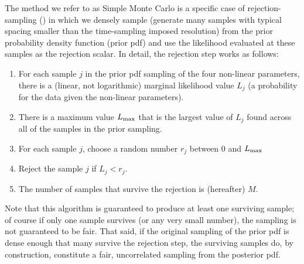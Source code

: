 \documentclass[manuscript, letterpaper]{aastex6}
\newcommand{\resp}[1]{{\color{mahogany}#1}}
\begin{document}
The method we refer to as Simple Monte Carlo is a specific case of
rejection-sampling (\citealt{VonNeumann:1951}) in which we densely sample
(\resp{generate many samples with typical spacing smaller than the time-sampling
imposed resolution}) from the prior probability density function (prior pdf) and
use the likelihood evaluated at these samples as the rejection scalar.
In detail, the rejection step works as follows:
\begin{enumerate}\itemsep0ex
\item For each sample $j$ in the prior pdf sampling of the four non-linear
  parameters, there is a (linear, not logarithmic) \resp{marginal} likelihood
  value $L_j$ (a probability for the data given the \resp{non-linear}
  parameters).
\item There is a maximum value $L_{\rm max}$ that is the largest value of
  $L_j$ found across all of the samples in the prior sampling.
\item For each sample $j$, choose a random number $r_j$ between 0 and
  $L_{\rm max}$
\item Reject the sample $j$ if $L_j < r_j$.
\item The number of samples that survive the rejection is (hereafter) $M$.
\end{enumerate}
Note that this algorithm is guaranteed to produce at least one
surviving sample; of course if only one sample survives (or any very
small number), the sampling is not guaranteed to be fair.
That said, if the original sampling of the prior pdf is dense enough
that many survive the rejection step, the surviving samples do, by construction,
constitute a fair, uncorrelated sampling from the posterior pdf.
\end{document}
